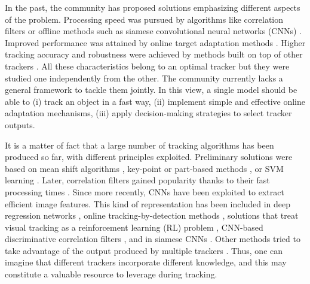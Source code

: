 \documentclass[runningheads]{llncs}
\begin{document}
In the past, the community has proposed solutions emphasizing different aspects of the problem. Processing speed was pursued by algorithms like correlation filters \cite{Bolme2010,KCF,DSST,Staple,Lukezic2018} or offline methods such as siamese convolutional neural networks (CNNs) \cite{GOTURN,RE3,SiamFC,SiamRPN,SiamRPNpp,DaSiam,Zhang2019}. 
Improved performance was attained by online target adaptation methods \cite{MDNet,RealTimeMDNet,ECO,ATOM,DiMP}.
Higher tracking accuracy and robustness were achieved by methods built on top of other trackers \cite{MEEM,Yoon2012,Wang2014,Bailer2014,HMMTxD}. All these characteristics belong to an optimal tracker but they were studied one independently from the other. The community currently lacks a general framework to tackle them jointly. In this view, a single model should be able to (i) track an object in a fast way, (ii) implement simple and effective online adaptation mechanisms, (iii) apply decision-making strategies to select tracker outputs.

It is a matter of fact that a large number of tracking algorithms has been produced so far, with different principles exploited. 
Preliminary solutions were based on mean shift algorithms \cite{Comanciu2000}, key-point \cite{Matrioska} or part-based methods \cite{LGT,OGT}, or SVM learning \cite{Struck}.
Later, correlation filters gained popularity thanks to their fast processing times \cite{Bolme2010,KCF,DSST,Staple,Lukezic2018}. 
Since more recently, CNNs have been exploited to extract efficient image features. This kind of representation has been included in deep regression networks \cite{GOTURN,RE3}, online tracking-by-detection methods \cite{MDNet,RealTimeMDNet}, solutions that treat visual tracking as a reinforcement learning (RL) problem \cite{Yun2017,Supancic2017,Choi2017,Ren2018,Chen2018,Dunnhofer2019}, CNN-based discriminative correlation filters \cite{CCOT,ECO,ATOM,DiMP}, and in siamese CNNs \cite{SiamFC,SiamRPN,SiamRPNpp,Zhang2019,SiamMask,Dunnhofer2020MedIA}. 
Other methods tried to take advantage of the output produced by multiple trackers \cite{MEEM,Yoon2012,Wang2014,Bailer2014,HMMTxD}.
Thus, one can imagine that different trackers incorporate different knowledge, and this may constitute a valuable resource to leverage during tracking. 
\end{document}
